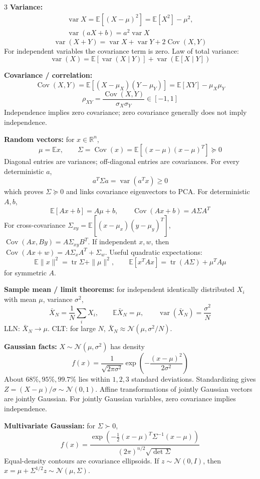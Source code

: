 \documentclass[10pt]{article}
\newcommand{\sub}[1]{\textbf{#1}}
\newcommand{\R}{\mathbb{R}}
\newcommand{\tr}{\operatorname{tr}}
\newcommand{\E}{\mathbb{E}}
\newcommand{\Var}{\operatorname{var}}
\newcommand{\Cov}{\operatorname{Cov}}
\begin{document}
\begin{multicols*}{3}
\sub{Variance:}
\[
\begin{gathered}
\Var X=\E[(X-\mu)^2]=\E[X^2]-\mu^2,\\
\Var(aX+b)=a^2\Var X
\end{gathered}
\]
\[
\Var(X+Y)=\Var X+\Var Y+2\Cov(X,Y)
\]
For independent variables the covariance term is zero.
Law of total variance:
\[
\Var(X)=\E[\Var(X\mid Y)]+\Var(\E[X\mid Y])
\]

\sub{Covariance / correlation:}
\[
\Cov(X,Y)=\E[(X-\mu_X)(Y-\mu_Y)]
=\E[XY]-\mu_X\mu_Y
\]
\[
\rho_{XY}=\frac{\Cov(X,Y)}{\sigma_X\sigma_Y}\in[-1,1]
\]
Independence implies zero covariance; zero covariance generally does not
imply independence.

\sub{Random vectors:} for \(x\in\R^n\),
\[
\mu=\E x,\qquad
\Sigma=\Cov(x)=\E[(x-\mu)(x-\mu)^T]\succeq0
\]
Diagonal entries are variances; off-diagonal entries are covariances.
For every deterministic \(a\),
\[
a^T\Sigma a=\Var(a^Tx)\ge0
\]
which proves \(\Sigma\succeq0\) and links covariance eigenvectors to PCA.
For deterministic \(A,b\),
\[
\E[Ax+b]=A\mu+b,\qquad
\Cov(Ax+b)=A\Sigma A^T
\]
For cross-covariance
\(\Sigma_{xy}=\E[(x-\mu_x)(y-\mu_y)^T]\),
\(\Cov(Ax,By)=A\Sigma_{xy}B^T\).
If independent \(x,w\), then
\(\Cov(Ax+w)=A\Sigma_xA^T+\Sigma_w\).
Useful quadratic expectations:
\[
\E\|x\|^2=\tr\Sigma+\|\mu\|^2,\qquad
\E[x^TAx]=\tr(A\Sigma)+\mu^TA\mu
\]
for symmetric \(A\).

\sub{Sample mean / limit theorems:} for independent identically
distributed \(X_i\) with mean \(\mu\), variance \(\sigma^2\),
\[
\bar X_N=\frac1N\sum_iX_i,\qquad
\E\bar X_N=\mu,\qquad
\Var(\bar X_N)=\frac{\sigma^2}{N}
\]
LLN: \(\bar X_N\to\mu\). CLT: for large \(N\),
\(\bar X_N\approx\mathcal N(\mu,\sigma^2/N)\).

\sub{Gaussian facts:} \(X\sim\mathcal N(\mu,\sigma^2)\) has density
\[
f(x)=\frac1{\sqrt{2\pi\sigma^2}}
\exp\left(-\frac{(x-\mu)^2}{2\sigma^2}\right)
\]
About \(68\%,95\%,99.7\%\) lies within \(1,2,3\) standard deviations.
Standardizing gives \(Z=(X-\mu)/\sigma\sim\mathcal N(0,1)\).
Affine transformations of jointly Gaussian vectors are jointly Gaussian.
For jointly Gaussian variables, zero covariance implies independence.

\sub{Multivariate Gaussian:} for \(\Sigma\succ0\),
\[
f(x)=\frac{\exp\!\left(-\tfrac12
(x-\mu)^T\Sigma^{-1}(x-\mu)\right)}
{(2\pi)^{n/2}\sqrt{\det\Sigma}}
\]
Equal-density contours are covariance ellipsoids. If
\(z\sim\mathcal N(0,I)\), then
\(x=\mu+\Sigma^{1/2}z\sim\mathcal N(\mu,\Sigma)\).


\end{multicols*}
\end{document}
